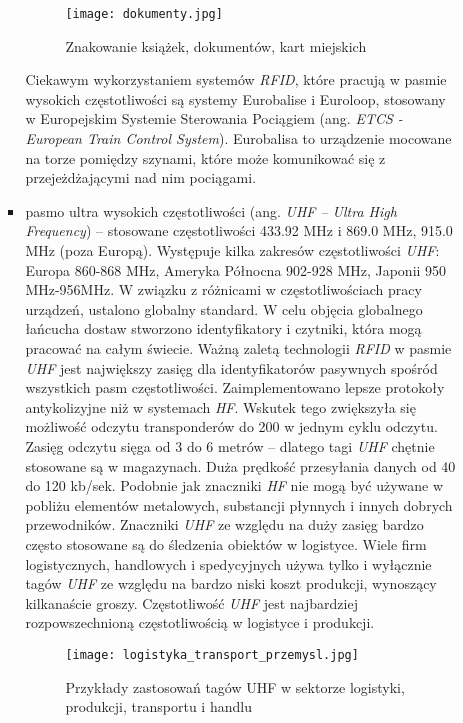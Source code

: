 \begin{itemize}
\begin{itemize}
\begin{itemize}
	\begin{figure}[h!]
	\centering
	    \texttt{[image: dokumenty.jpg]}
	    \caption{Znakowanie książek, dokumentów, kart miejskich}
	\end{figure}
	
	Ciekawym wykorzystaniem systemów \emph{RFID}, które pracują w pasmie wysokich częstotliwości są systemy Eurobalise i Euroloop, stosowany w Europejskim Systemie Sterowania Pociągiem (ang. \emph{ETCS - European Train Control System}). Eurobalisa to urządzenie mocowane na torze pomiędzy szynami, które może komunikować się z przejeżdżającymi nad nim pociągami.


	\item pasmo ultra wysokich częstotliwości (ang. \emph{UHF – Ultra High Frequency}) – stosowane częstotliwości 433.92 MHz i 869.0 MHz, 915.0 MHz (poza Europą).
Występuje kilka zakresów częstotliwości \emph{UHF}: Europa 860-868 MHz, Ameryka Północna 902-928 MHz, Japonii  950 MHz-956MHz. W związku z różnicami w częstotliwościach pracy urządzeń, ustalono globalny standard.  W celu objęcia globalnego łańcucha dostaw stworzono identyfikatory i czytniki, która mogą pracować na całym świecie. Ważną zaletą technologii \emph{RFID} w pasmie \emph{UHF} jest największy zasięg dla identyfikatorów pasywnych spośród wszystkich pasm częstotliwości. Zaimplementowano lepsze protokoły antykolizyjne niż w systemach \emph{HF}. Wskutek tego zwiększyła się możliwość odczytu transponderów do 200 w jednym cyklu odczytu.  Zasięg odczytu sięga od 3 do 6 metrów – dlatego tagi \emph{UHF} chętnie stosowane są w magazynach.  Duża prędkość przesyłania danych od 40 do 120 kb/sek.  
Podobnie jak znaczniki \emph{HF} nie mogą być używane w pobliżu elementów metalowych, substancji płynnych i innych dobrych przewodników. 
Znaczniki \emph{UHF} ze względu na duży zasięg bardzo często stosowane są do śledzenia obiektów w logistyce. Wiele firm logistycznych, handlowych i spedycyjnych używa tylko i wyłącznie tagów \emph{UHF} ze względu na bardzo niski koszt produkcji, wynoszący kilkanaście groszy. 
Częstotliwość \emph{UHF} jest najbardziej rozpowszechnioną częstotliwością w logistyce i produkcji.

	\begin{figure}[h!]
	\centering
	    \texttt{[image: logistyka\_transport\_przemysl.jpg]}
	    \caption{Przykłady zastosowań tagów UHF w sektorze logistyki, produkcji, transportu i handlu}
	\end{figure}


\end{itemize}
\end{itemize}
\end{itemize}
